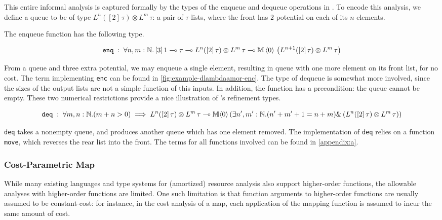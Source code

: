 This entire informal analysis is captured formally by the types of the enqueue and dequeue operations in \dlambdaamor. To encode this analysis, we define a queue to be of type $ L^n([2] \, \tau) \otimes L^m \, \tau$: a pair of $\tau$-lists, where the front has $2$ potential on each of its $n$ elements.

The enqueue function has the following type.

$$
\texttt{enq} \; : \; \forall n,m : \mathbb{N}. \, [3] \, 1 \multimap \tau \multimap L^n([2] \, \tau) \otimes L^m \, \tau \multimap \mathbb{M} \, \langle 0 \rangle \, \left(L^{n+1}([2] \, \tau) \otimes L^m \, \tau\right)
$$

From a queue and three extra potential, we may enqueue a single element, resulting in queue with one more element on its front list, for no cost. The term implementing \texttt{enc} can be found in \autoref{fig:example-dlambdaamor-enc}. The type of dequeue is somewhat more involved, since the sizes of the output lists are not a simple function of this inputs. In addition, the function has a precondition: the queue cannot be empty. These two numerical restrictions provide a nice illustration of \dlambdaamor's refinement types.

$$
\texttt{deq} \; : \; \forall m,n : \mathbb{N}. (m + n > 0) \implies L^n([2] \, \tau) \otimes L^m \, \tau \multimap \mathbb{M} \langle 0 \rangle \left(\exists n',m' : \mathbb{N}. (n' + m' + 1 = n + m) \& \left(L^n([2] \, \tau) \otimes L^m \, \tau\right)\right)
$$

\texttt{deq} takes a nonempty queue, and produces another queue which has one element removed. The implementation of \texttt{deq} relies on a function \texttt{move}, which reverses the rear list into the front. The terms for all functions involved can be found in \autoref{appendix:a}.



\subsubsection{Cost-Parametric Map}
While many existing languages and type systems for (amortized) resource analysis also support higher-order functions, the allowable analyses with higher-order functions are limited. One such limitation is that function arguments to higher-order functions are usually assumed to be constant-cost: for instance, in the cost analysis of a map, each application of the mapping function is assumed to incur the same amount of cost.

